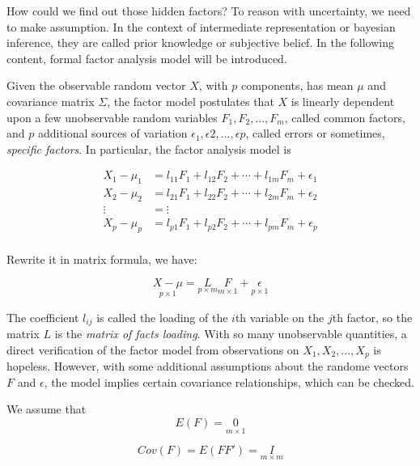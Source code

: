 \documentclass[a4paper]{book}
\begin{document}
  How could we find out those hidden factors? To reason with uncertainty, we
  need to make assumption. In the context of intermediate representation or
  bayesian inference, they are called prior  knowledge or subjective belief. In
  the following content, formal factor analysis model will be introduced.

  Given the observable random vector $X$, with $p$ components, has mean
  $\mu$ and covariance matrix $\Sigma$, the factor model postulates that $X$ is
  linearly dependent upon a few unobservable random variables $F_{1}, F_{2},
  ... , F_{m}$, called common factors, and $p$ additional sources of variation
  $\epsilon_{1}, \epsilon{2}, ... , \epsilon{p}$, called errors or sometimes,
  \textit{specific factors}. In particular, the factor analysis model is

  \begin{align*}
    X_{1} - \mu_{1} &= l_{11}F_{1} + l_{12}F_{2} + \cdots + l_{1m}F_{m} + \epsilon_{1}\\
    X_{2} - \mu_{2} &= l_{21}F_{1} + l_{22}F_{2} + \cdots + l_{2m}F_{m} + \epsilon_{2}\\
    \vdots          &= \vdots \\
    X_{p} - \mu_{p} &= l_{p1}F_{1} + l_{p2}F_{2} + \cdots + l_{pm}F_{m} + \epsilon_{p}\\
  \end{align*}

  Rewrite it in matrix formula, we have:

  \begin{displaymath}
    \underset{p \times 1}{X - \mu} = \underset{p \times m}{L}\underset{m \times
      1}{F} + \underset{p \times 1}\epsilon
  \end{displaymath}

  The coefficient $l_{ij}$ is called the loading of the $i$th variable on the
  $j$th factor, so the matrix $L$ is the \textit{matrix of facts loading}. With
  so many unobservable quantities, a direct verification of the factor model
  from observations on $X_{1}, X_{2}, ... , X_{p}$ is hopeless. However, with
  some additional assumptions about the randome vectors $F$ and $\epsilon$, the
  model implies certain covariance relationships, which can be checked.

  We assume that
  \begin{displaymath}
    E(F) = \underset{m \times 1}{0} 
  \end{displaymath}

  \begin{displaymath}
    Cov(F) = E(FF') = \underset{m \times m}{I}
  \end{displaymath}
\end{document}
